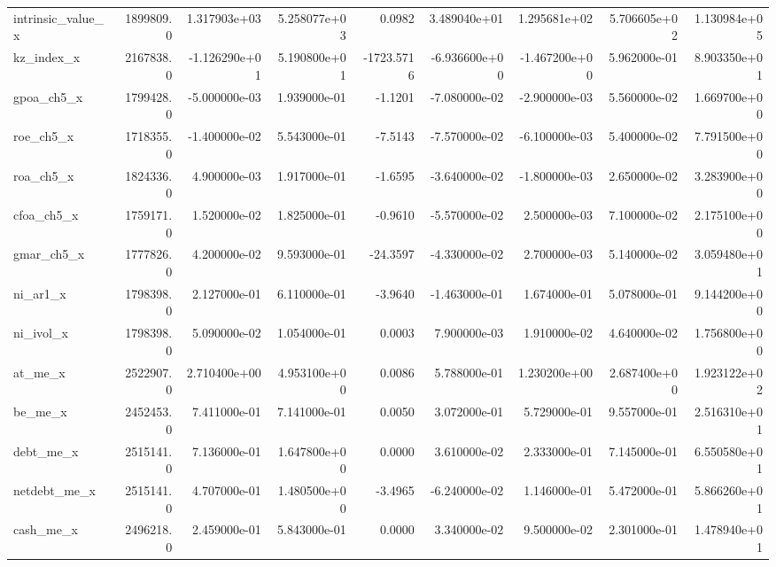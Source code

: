 \documentclass[12pt]{article}
\begin{document}
\begin{landscape}
\begin{longtable}{|l|r|r|r|r|r|r|r|r|}
intrinsic\_value\_x       &  1899809.0 &  1.317903e+03 &  5.258077e+03 &      0.0982 &  3.489040e+01 &  1.295681e+02 &  5.706605e+02 &  1.130984e+05 \\
kz\_index\_x              &  2167838.0 & -1.126290e+01 &  5.190800e+01 &  -1723.5716 & -6.936600e+00 & -1.467200e+00 &  5.962000e-01 &  8.903350e+01 \\
gpoa\_ch5\_x              &  1799428.0 & -5.000000e-03 &  1.939000e-01 &     -1.1201 & -7.080000e-02 & -2.900000e-03 &  5.560000e-02 &  1.669700e+00 \\
roe\_ch5\_x               &  1718355.0 & -1.400000e-02 &  5.543000e-01 &     -7.5143 & -7.570000e-02 & -6.100000e-03 &  5.400000e-02 &  7.791500e+00 \\
roa\_ch5\_x               &  1824336.0 &  4.900000e-03 &  1.917000e-01 &     -1.6595 & -3.640000e-02 & -1.800000e-03 &  2.650000e-02 &  3.283900e+00 \\
cfoa\_ch5\_x              &  1759171.0 &  1.520000e-02 &  1.825000e-01 &     -0.9610 & -5.570000e-02 &  2.500000e-03 &  7.100000e-02 &  2.175100e+00 \\
gmar\_ch5\_x              &  1777826.0 &  4.200000e-02 &  9.593000e-01 &    -24.3597 & -4.330000e-02 &  2.700000e-03 &  5.140000e-02 &  3.059480e+01 \\
ni\_ar1\_x                &  1798398.0 &  2.127000e-01 &  6.110000e-01 &     -3.9640 & -1.463000e-01 &  1.674000e-01 &  5.078000e-01 &  9.144200e+00 \\
ni\_ivol\_x               &  1798398.0 &  5.090000e-02 &  1.054000e-01 &      0.0003 &  7.900000e-03 &  1.910000e-02 &  4.640000e-02 &  1.756800e+00 \\
at\_me\_x                 &  2522907.0 &  2.710400e+00 &  4.953100e+00 &      0.0086 &  5.788000e-01 &  1.230200e+00 &  2.687400e+00 &  1.923122e+02 \\
be\_me\_x                 &  2452453.0 &  7.411000e-01 &  7.141000e-01 &      0.0050 &  3.072000e-01 &  5.729000e-01 &  9.557000e-01 &  2.516310e+01 \\
debt\_me\_x               &  2515141.0 &  7.136000e-01 &  1.647800e+00 &      0.0000 &  3.610000e-02 &  2.333000e-01 &  7.145000e-01 &  6.550580e+01 \\
netdebt\_me\_x            &  2515141.0 &  4.707000e-01 &  1.480500e+00 &     -3.4965 & -6.240000e-02 &  1.146000e-01 &  5.472000e-01 &  5.866260e+01 \\
cash\_me\_x               &  2496218.0 &  2.459000e-01 &  5.843000e-01 &      0.0000 &  3.340000e-02 &  9.500000e-02 &  2.301000e-01 &  1.478940e+01 \\

\end{longtable}
\end{landscape}
\end{document}
